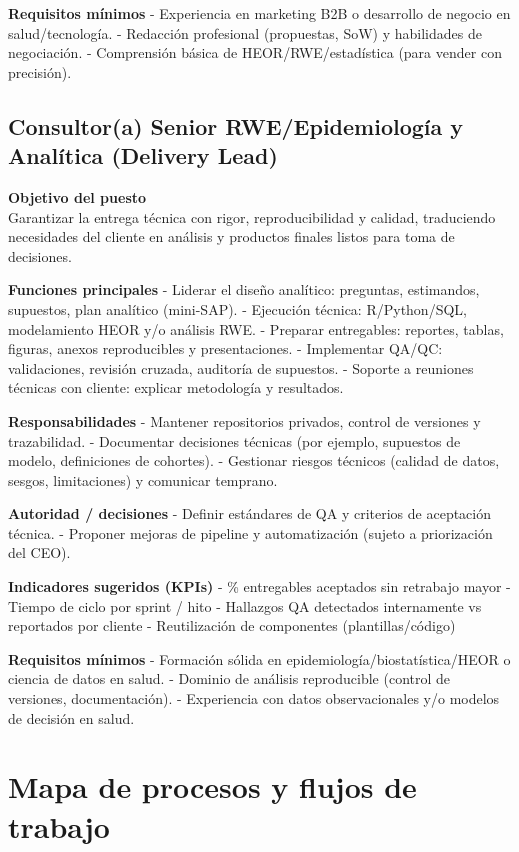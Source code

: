 \documentclass[
  spanish,
]{article}
\begin{document}
\textbf{Requisitos mínimos} - Experiencia en marketing B2B o desarrollo
de negocio en salud/tecnología. - Redacción profesional (propuestas,
SoW) y habilidades de negociación. - Comprensión básica de
HEOR/RWE/estadística (para vender con precisión).

\subsection{Consultor(a) Senior RWE/Epidemiología y Analítica (Delivery
Lead)}\label{consultora-senior-rweepidemiologuxeda-y-analuxedtica-delivery-lead}

\textbf{Objetivo del puesto}\\
Garantizar la entrega técnica con rigor, reproducibilidad y calidad,
traduciendo necesidades del cliente en análisis y productos finales
listos para toma de decisiones.

\textbf{Funciones principales} - Liderar el diseño analítico: preguntas,
estimandos, supuestos, plan analítico (mini-SAP). - Ejecución técnica:
R/Python/SQL, modelamiento HEOR y/o análisis RWE. - Preparar
entregables: reportes, tablas, figuras, anexos reproducibles y
presentaciones. - Implementar QA/QC: validaciones, revisión cruzada,
auditoría de supuestos. - Soporte a reuniones técnicas con cliente:
explicar metodología y resultados.

\textbf{Responsabilidades} - Mantener repositorios privados, control de
versiones y trazabilidad. - Documentar decisiones técnicas (por ejemplo,
supuestos de modelo, definiciones de cohortes). - Gestionar riesgos
técnicos (calidad de datos, sesgos, limitaciones) y comunicar temprano.

\textbf{Autoridad / decisiones} - Definir estándares de QA y criterios
de aceptación técnica. - Proponer mejoras de pipeline y automatización
(sujeto a priorización del CEO).

\textbf{Indicadores sugeridos (KPIs)} - \% entregables aceptados sin
retrabajo mayor - Tiempo de ciclo por sprint / hito - Hallazgos QA
detectados internamente vs reportados por cliente - Reutilización de
componentes (plantillas/código)

\textbf{Requisitos mínimos} - Formación sólida en
epidemiología/biostatística/HEOR o ciencia de datos en salud. - Dominio
de análisis reproducible (control de versiones, documentación). -
Experiencia con datos observacionales y/o modelos de decisión en salud.

\section{Mapa de procesos y flujos de
trabajo}\label{mapa-de-procesos-y-flujos-de-trabajo}
\end{document}
